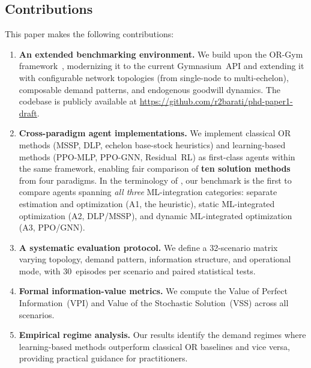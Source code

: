 \documentclass[preprint,12pt]{elsarticle}
\begin{document}
\subsection{Contributions}

This paper makes the following contributions:

\begin{enumerate}
  \item \textbf{An extended benchmarking environment.} We build upon the
        OR-Gym framework~\citep{hubbs2020orgym}, modernizing it to the
        current Gymnasium~API and extending it with configurable network
        topologies (from single-node to multi-echelon), composable demand
        patterns, and endogenous goodwill dynamics. The codebase is
        publicly available at
        \url{https://github.com/r2barati/phd-paper1-draft}.

  \item \textbf{Cross-paradigm agent implementations.} We implement
        classical OR methods (MSSP, DLP, echelon base-stock heuristics)
        and learning-based methods (PPO-MLP, PPO-GNN, Residual~RL)
        as first-class agents within the same framework, enabling fair
        comparison of \textbf{ten solution methods} from four paradigms.
        In the terminology of \citet{bergsma2025systematic}, our
        benchmark is the first to compare agents spanning \emph{all three}
        ML-integration categories: separate estimation and optimization
        (A1, the heuristic), static ML-integrated optimization (A2,
        DLP/MSSP), and dynamic ML-integrated optimization (A3, PPO/GNN).

  \item \textbf{A systematic evaluation protocol.} We define a
        32-scenario matrix varying topology, demand pattern, information
        structure, and operational mode, with 30~episodes per scenario
        and paired statistical tests.

  \item \textbf{Formal information-value metrics.} We compute the Value of
        Perfect Information~(VPI) and Value of the Stochastic
        Solution~(VSS) across all scenarios.

  \item \textbf{Empirical regime analysis.} Our results identify the
        demand regimes where learning-based methods outperform classical
        OR baselines and vice versa, providing practical guidance for
        practitioners.
\end{enumerate}
\end{document}
